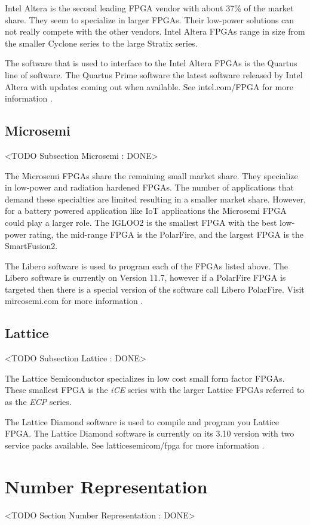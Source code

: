 Intel Altera is the second leading \ac{FPGA} vendor with about 37\% of the market share. They seem to specialize in larger \ac{FPGA}s. Their low-power solutions can not really compete with the other vendors. Intel Altera \ac{FPGA}s range in size from the smaller Cyclone series to the large Stratix series. 

The software that is used to interface to the Intel Altera \ac{FPGA}s is the Quartus line of software. The Quartus Prime software the latest software released by Intel Altera with updates coming out when available. See intel.com/FPGA for more information \cite{alteraref}.
	
\subsection{Microsemi}
	<TODO Subsection Microsemi : DONE>

The Microsemi \ac{FPGA}s share the remaining small market share. They specialize in low-power and radiation hardened \ac{FPGA}s. The number of applications that demand these specialties are limited resulting in a smaller market share. However, for a battery powered application like \ac{IoT} applications the Microsemi \ac{FPGA} could play a larger role. The IGLOO2 is the smallest \ac{FPGA} with the best low-power rating, the mid-range \ac{FPGA} is the PolarFire, and the largest \ac{FPGA} is the SmartFusion2. 

The Libero software is used to program each of the \ac{FPGA}s listed above. The Libero software is currently on Version 11.7, however if a PolarFire \ac{FPGA} is targeted then there is a special version of the software call Libero PolarFire. Visit	mircosemi.com for more information \cite{}. 
	
\subsection{Lattice}
	<TODO Subsection Lattice : DONE>
	
The Lattice Semiconductor specializes in low cost small form factor \ac{FPGA}s. These smallest \ac{FPGA} is the \emph{iCE} series with the larger Lattice \ac{FPGA}s referred to as the \emph{ECP} series. 

The Lattice Diamond software is used to compile and program you Lattice FPGA. The Lattice Diamond software is currently on its 3.10 version with two service packs available. See latticesemicom/fpga for more information \cite{latref}. 

\section{Number Representation}
	<TODO Section Number Representation : DONE>

